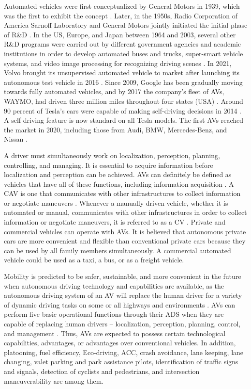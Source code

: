 \documentclass[a4paper,12pt]{article}
\begin{document}
Automated vehicles were first conceptualized by General Motors in 1939, which was the first to exhibit the concept \cite{article14}. Later, in the 1950s, Radio Corporation of America Sarnoff Laboratory and General Motors jointly initiated the initial phase of  R\&D
\cite{article14}. In the US, Europe, and Japan between 1964 and 2003, several other R\&D programs were carried out by different government agencies and academic institutions in order to develop automated buses and trucks, super-smart vehicle systems, and video image processing for recognizing driving scenes \cite{article14}. In 2021, Volvo brought its unsupervised automated vehicle to market after launching its autonomous test vehicle in 2016 \cite{article14}. Since 2009, Google has been gradually moving towards fully automated vehicles, and by 2017 the company's fleet of AVs, WAYMO, had driven three million miles throughout four states (USA) \cite{article14}. Around 90 percent of Tesla's cars were capable of making self-driving decisions in 2014 \cite{article14}. A self-driving feature is now standard on all Tesla models. The first AVs reached the market in 2020, including those from Audi, BMW, Mercedes-Benz, and Nissan \cite{article14}.\par A driver must simultaneously work on localization, perception, planning, controlling, and managing. It is essential to acquire information before localization and perception can be achieved. AVs can definitely be defined as vehicles that have all of these functions, including information acquisition \cite{article14}. A CAV is one that communicates with other infrastructures to collect information or negotiate maneuvers \cite{article14}. Whenever a manually driven vehicle, whether it is automated or manual, communicates with other infrastructures in order to collect information or negotiate maneuvers, it is referred to as a CV \cite{article14}. Private and commercial vehicles can operate with AVs. It is believed that autonomous private cars are more convenient and flexible than conventional private cars because they can be used by all family members simultaneously. A commercial automated vehicle could be used as a taxi, a bus, or as a freight vehicle. \par Mobility is predicted to be safer, sustainable, and more convenient in the future when autonomous driving technology and capabilities are available, as the autonomous driving system of an AV will replace the human driver for a variety of dynamic driving tasks on some or all highways and environments \cite{article14}. AVs can perform five basic operational functions through their ADS when they are capable of replacing human drivers -- localization, perception, planning, control, and management \cite{article14}. Thus, AVs are expected to possess certain technological capabilities, advantages, or advantages over conventional vehicles. In addition, platooning, fuel efficiency, Eco-driving, ACC, crash avoidance, lane keeping, lane changing, valet parking and park assistance pilots, identification of traffic signs and signals, detection of cyclists and pedestrians, and intersection maneuverability are among them.
\end{document}
